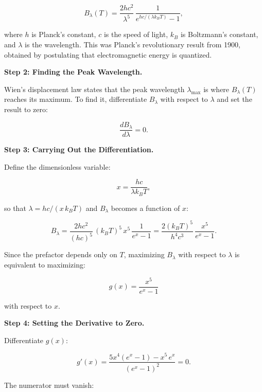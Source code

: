 \begin{equation}
B_\lambda(T) = \frac{2hc^2}{\lambda^5}\,\frac{1}{e^{hc/(\lambda k_B T)} - 1},
\end{equation}

where $h$ is Planck's constant, $c$ is the speed of light, $k_B$ is Boltzmann's constant, and $\lambda$ is the wavelength. This was Planck's revolutionary result from 1900, obtained by postulating that electromagnetic energy is quantized.

\textbf{Step 2: Finding the Peak Wavelength.}

Wien's displacement law states that the peak wavelength $\lambda_{\max}$ is where $B_\lambda(T)$ reaches its maximum. To find it, differentiate $B_\lambda$ with respect to $\lambda$ and set the result to zero:

\begin{equation}
\frac{dB_\lambda}{d\lambda} = 0.
\end{equation}

\textbf{Step 3: Carrying Out the Differentiation.}

Define the dimensionless variable:

\begin{equation}
x = \frac{hc}{\lambda k_B T},
\end{equation}

so that $\lambda = hc/(x\,k_B T)$ and $B_\lambda$ becomes a function of $x$:

\begin{equation}
B_\lambda = \frac{2hc^2}{(hc)^5}\,(k_B T)^5\,x^5\,\frac{1}{e^x - 1} = \frac{2(k_B T)^5}{h^4 c^3}\,\frac{x^5}{e^x - 1}.
\end{equation}

Since the prefactor depends only on $T$, maximizing $B_\lambda$ with respect to $\lambda$ is equivalent to maximizing:

\begin{equation}
g(x) = \frac{x^5}{e^x - 1}
\end{equation}

with respect to $x$.

\textbf{Step 4: Setting the Derivative to Zero.}

Differentiate $g(x)$:

\begin{equation}
g'(x) = \frac{5x^4(e^x - 1) - x^5\,e^x}{(e^x - 1)^2} = 0.
\end{equation}

The numerator must vanish:

